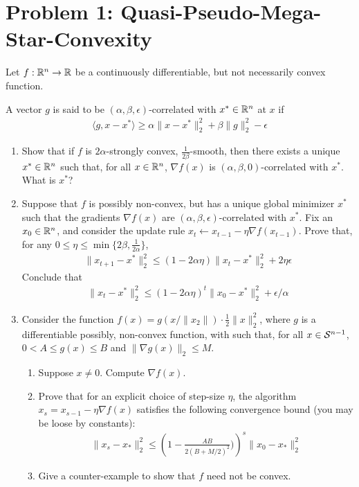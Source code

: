 \documentclass[12pt]{article}
\begin{document}
\section*{Problem 1: Quasi-Pseudo-Mega-Star-Convexity}
	Let $f: \mathbb{R}^n \to \mathbb{R}$ be a continuously differentiable, but not necessarily convex function. 
	\begin{definition}[Correlation] A vector $g$ is said to be $(\alpha,\beta,\epsilon)$-correlated with $x^* \in \mathbb{R}^n$ at $x$ if
	\begin{eqnarray}
	\langle g, x - x^* \rangle \ge \alpha \|x-x^*\|_2^2 + \beta \|g\|_2^2 - \epsilon
	\end{eqnarray}
	\end{definition}
	\begin{enumerate}
		\item Show that if $f$ is $2\alpha$-strongly convex, $\frac{1}{2\beta}$-smooth, then there exists a unique $x^* \in \mathbb{R}^n$ such that, for all $x \in \mathbb{R}^n$, $\nabla f(x)$ is $(\alpha,\beta,0)$-correlated with $x^*$. What is $x^*$?
		\item Suppose that $f$ is possibly non-convex, but has a unique global minimizer $x^*$ such that the gradients $\nabla f(x)$ are $(\alpha,\beta,\epsilon)$-correlated with $x^*$. Fix an $x_0 \in \mathbb{R}^n$, and consider the update rule $x_t \leftarrow x_{t-1} - \eta \nabla f(x_{t-1})$. Prove that, for any $0 \le \eta \le \min\{2\beta,\frac{1}{2\alpha}\}$,
		\begin{eqnarray}
		\|x_{t+1} - x^*\|_2^2 \le (1-2\alpha \eta)\|x_{t} - x^*\|_2^2 + 2\eta \epsilon
		\end{eqnarray}
		Conclude that 
		\begin{eqnarray}
		\|x_{t} - x^*\|_2^2 \le (1-2\alpha \eta)^t\|x_{0} - x^*\|_2^2 + \epsilon/\alpha
		\end{eqnarray}
		\item Consider the function $f(x) = g(x/\|x_2\|) \cdot \frac{1}{2}\|x\|_2^2$, where $g$ is a differentiable possibly, non-convex function, with such that, for all $x \in {\cal S}^{n-1}$, $0 < A \le g(x) \le B$ and $\|\nabla g(x)\|_2 \le M$. 
		\begin{enumerate}
			\item Suppose $x \ne 0$. Compute $\nabla f(x)$. 
			\item Prove that for an explicit choice of step-size $\eta$, the algorithm $x_{s} = x_{s-1} - \eta \nabla f(x)$ satisfies the following convergence bound (you may be loose by constants):
			\begin{eqnarray}
			\|x_s - x_*\|_2^2 \le \left(1 - \frac{AB}{2(B+M/2)^2})\right)^s \|x_0 - x_*\|_2^2
			\end{eqnarray}
			\item Give a counter-example to show that $f$ need not be convex.
		\end{enumerate} 

	\end{enumerate}
\end{document}
